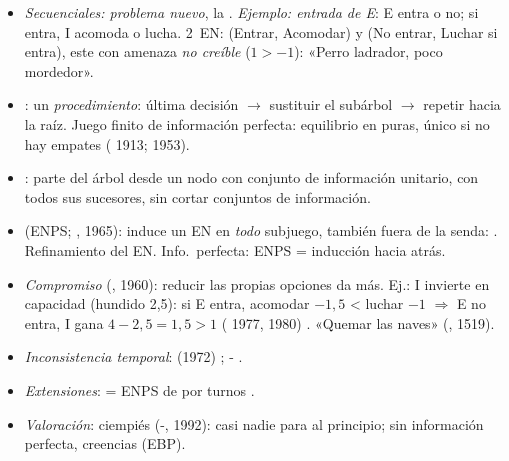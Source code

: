 \documentclass{article}
\begin{document}
\begin{columnas}
\begin{itemize}
\item \emph{Secuenciales: problema nuevo}, la . \emph{Ejemplo: entrada de E}: E entra o no; si entra, I acomoda o lucha. 2~EN: (Entrar, Acomodar) y (No entrar, Luchar si entra), este con amenaza \emph{no creíble} ($1>-1$): «Perro ladrador, poco mordedor».
\end{itemize}
\begin{itemize}
\item {}: un \emph{procedimiento}: última decisión $\to$ sustituir el subárbol $\to$ repetir hacia la raíz. Juego finito de información perfecta: equilibrio en puras, único si no hay empates ( 1913;  1953).
\item {}: parte del árbol desde un nodo con conjunto de información unitario, con todos sus sucesores, sin cortar conjuntos de información.
\item {} (ENPS; , 1965): induce un EN en \emph{todo} subjuego, también fuera de la senda: . Refinamiento del EN. Info.\ perfecta: ENPS = inducción hacia atrás.
\item \emph{Compromiso} (, 1960): reducir las propias opciones da más. Ej.: \textup{I} invierte en capacidad (hundido 2,5): si E entra, acomodar $-1{,}5$ < luchar $-1$ $\Rightarrow$ E no entra, I gana $4-2{,}5=1{,}5>1$ ( 1977,  1980) . «Quemar las naves» (, 1519).
\item \emph{Inconsistencia temporal}:  (1972) ; - .
\item \emph{Extensiones}:  = ENPS de  por turnos .
\item \emph{Valoración}: ciempiés (-, 1992): casi nadie para al principio; sin información perfecta, creencias (EBP).
\end{itemize}
\begin{itemize}

\end{itemize}
\end{columnas}
\end{document}
